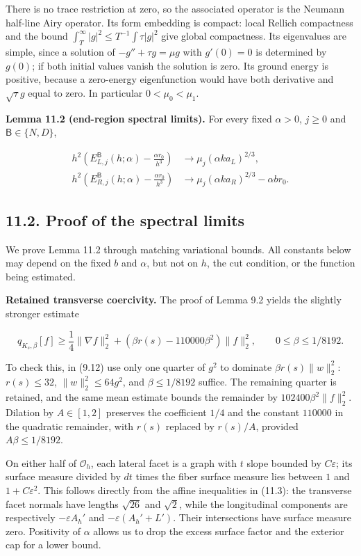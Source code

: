 \documentclass[11pt]{article}
\begin{document}
There is no trace restriction at zero, so the associated operator is the
Neumann half-line Airy operator. Its form embedding is compact: local
Rellich compactness and the bound
\(\int_T^\infty|g|^2\le T^{-1}\int\tau|g|^2\) give global compactness.
Its eigenvalues are simple, since a solution of \(-g''+\tau g=\mu g\)
with \(g'(0)=0\) is determined by \(g(0)\); if both initial values
vanish the solution is zero. Its ground energy is positive, because a
zero-energy eigenfunction would have both derivative and \(\sqrt\tau g\)
equal to zero. In particular \(0<\mu_0<\mu_1\).

\textbf{Lemma 11.2 (end-region spectral limits).} For every fixed
\(\alpha>0\), \(j\ge0\) and \(\mathsf B\in\{N,D\}\),

\[
\begin{aligned}
h^2\left(E_{L,j}^{\mathsf B}(h;\alpha)-\frac{\alpha r_0}{h^3}\right)
&\longrightarrow \mu_j(\alpha k a_L)^{2/3},\\
h^2\left(E_{R,j}^{\mathsf B}(h;\alpha)-\frac{\alpha r_0}{h^3}\right)
&\longrightarrow \mu_j(\alpha k a_R)^{2/3}-\alpha br_0.
\end{aligned}
\tag{11.9}
\]

\subsection{11.2. Proof of the spectral
limits}\label{proof-of-the-spectral-limits}

We prove Lemma 11.2 through matching variational bounds. All constants
below may depend on the fixed \(b\) and \(\alpha\), but not on \(h\),
the cut condition, or the function being estimated.

\textbf{Retained transverse coercivity.} The proof of Lemma 9.2 yields
the slightly stronger estimate

\[
q_{K_s,\beta}[f]\ge\frac14\|\nabla f\|_2^2
 +(\beta r(s)-110000\beta^2)\|f\|_2^2,
\qquad 0\le\beta\le1/8192.
\tag{11.10}
\]

To check this, in (9.12) use only one quarter of \(g^2\) to dominate
\(\beta r(s)\|w\|_2^2\): \(r(s)\le32\), \(\|w\|_2^2\le64g^2\), and
\(\beta\le1/8192\) suffice. The remaining quarter is retained, and the
same mean estimate bounds the remainder by \(102400\beta^2\|f\|_2^2\).
Dilation by \(A\in[1,2]\) preserves the coefficient \(1/4\) and the
constant \(110000\) in the quadratic remainder, with \(r(s)\) replaced
by \(r(s)/A\), provided \(A\beta\le1/8192\).

On either half of \(\mathcal O_h\), each lateral facet is a graph with
\(t\) slope bounded by \(C\varepsilon\); its surface measure divided by
\(dt\) times the fiber surface measure lies between \(1\) and
\(1+C\varepsilon^2\). This follows directly from the affine inequalities
in (11.3): the transverse facet normals have lengths \(\sqrt{26}\) and
\(\sqrt2\), while the longitudinal components are respectively
\(-\varepsilon A_h'\) and \(-\varepsilon(A_h'+L')\). Their intersections
have surface measure zero. Positivity of \(\alpha\) allows us to drop
the excess surface factor and the exterior cap for a lower bound.
\end{document}
